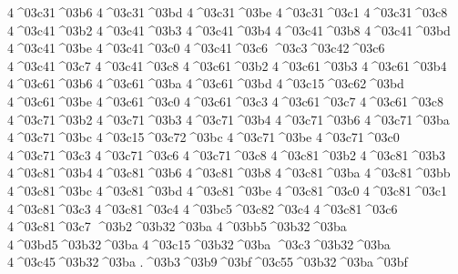{4^^^^03c31^^^^03b6 
4^^^^03c31^^^^03bd %
4^^^^03c31^^^^03be
4^^^^03c31^^^^03c1
4^^^^03c31^^^^03c8
4^^^^03c41^^^^03b2
4^^^^03c41^^^^03b3
4^^^^03c41^^^^03b4
4^^^^03c41^^^^03b8
4^^^^03c41^^^^03bd
4^^^^03c41^^^^03be
4^^^^03c41^^^^03c0
4^^^^03c41^^^^03c6
^^^^03c3^^^^03c42^^^^03c6 %
4^^^^03c41^^^^03c7
4^^^^03c41^^^^03c8
4^^^^03c61^^^^03b2
4^^^^03c61^^^^03b3
4^^^^03c61^^^^03b4
4^^^^03c61^^^^03b6
4^^^^03c61^^^^03ba %
4^^^^03c61^^^^03bd
4^^^^03c15^^^^03c62^^^^03bd %
4^^^^03c61^^^^03be
4^^^^03c61^^^^03c0
4^^^^03c61^^^^03c3
4^^^^03c61^^^^03c7
4^^^^03c61^^^^03c8
4^^^^03c71^^^^03b2
4^^^^03c71^^^^03b3
4^^^^03c71^^^^03b4
4^^^^03c71^^^^03b6
4^^^^03c71^^^^03ba
4^^^^03c71^^^^03bc
4^^^^03c15^^^^03c72^^^^03bc %
4^^^^03c71^^^^03be
4^^^^03c71^^^^03c0
4^^^^03c71^^^^03c3
4^^^^03c71^^^^03c6
4^^^^03c71^^^^03c8
4^^^^03c81^^^^03b2
4^^^^03c81^^^^03b3
4^^^^03c81^^^^03b4
4^^^^03c81^^^^03b6
4^^^^03c81^^^^03b8
4^^^^03c81^^^^03ba
4^^^^03c81^^^^03bb
4^^^^03c81^^^^03bc
4^^^^03c81^^^^03bd
4^^^^03c81^^^^03be
4^^^^03c81^^^^03c0
4^^^^03c81^^^^03c1
4^^^^03c81^^^^03c3
4^^^^03c81^^^^03c4
4^^^^03bc5^^^^03c82^^^^03c4 %
4^^^^03c81^^^^03c6
4^^^^03c81^^^^03c7
^^^^03b2^^^^03b32^^^^03ba
4^^^^03bb5^^^^03b32^^^^03ba
4^^^^03bd5^^^^03b32^^^^03ba
4^^^^03c15^^^^03b32^^^^03ba
^^^^03c3^^^^03b32^^^^03ba
4^^^^03c45^^^^03b32^^^^03ba
.^^^^03b3^^^^03b9^^^^03bf^^^^03c55^^^^03b32^^^^03ba^^^^03bf   %
}
